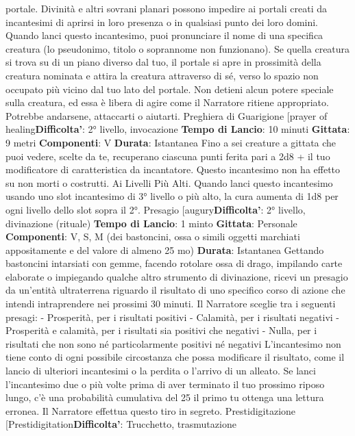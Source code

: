\begin{multicols}{2}
portale.
Divinità e altri sovrani planari possono impedire ai
portali creati da incantesimi di aprirsi in loro presenza o
in qualsiasi punto dei loro domini.
Quando lanci questo incantesimo, puoi pronunciare il
nome di una specifica creatura (lo pseudonimo, titolo o
soprannome non funzionano). Se quella creatura si
trova su di un piano diverso dal tuo, il portale si apre in
prossimità della creatura nominata e attira la creatura
attraverso di sé, verso lo spazio non occupato più vicino
dal tuo lato del portale. Non detieni alcun potere
speciale sulla creatura, ed essa è libera di agire come il
Narratore ritiene appropriato. Potrebbe andarsene, attaccarti
o aiutarti.
Preghiera di Guarigione
[prayer of healing\textbf{Difficolta'}:
2° livello, invocazione
\textbf{Tempo di Lancio}: 10 minuti
\textbf{Gittata}: 9 metri
\textbf{Componenti}: V
\textbf{Durata}: Istantanea
Fino a sei creature a gittata che puoi vedere, scelte da
te, recuperano ciascuna punti ferita pari a 2d8 + il tuo
modificatore di caratteristica da incantatore. Questo
incantesimo non ha effetto su non morti o costrutti.
Ai Livelli Più Alti. Quando lanci questo incantesimo
usando uno slot incantesimo di 3° livello o più alto, la
cura aumenta di 1d8 per ogni livello dello slot sopra il
2°.
Presagio
[augury\textbf{Difficolta'}:
2° livello, divinazione (rituale)
\textbf{Tempo di Lancio}: 1 minto
\textbf{Gittata}: Personale
\textbf{Componenti}: V, S, M (dei bastoncini, ossa o simili
oggetti marchiati appositamente e del valore di almeno
25 mo)
\textbf{Durata}: Istantanea
Gettando bastoncini intarsiati con gemme, facendo
rotolare ossa di drago, impilando carte elaborate o
impiegando qualche altro strumento di divinazione,
ricevi un presagio da un’entità ultraterrena riguardo il
risultato di uno specifico corso di azione che intendi
intraprendere nei prossimi 30 minuti. Il Narratore sceglie tra i
seguenti presagi:
- Prosperità, per i risultati positivi
- Calamità, per i risultati negativi
- Prosperità e calamità, per i risultati sia positivi che
negativi
- Nulla, per i risultati che non sono né particolarmente
positivi né negativi
L’incantesimo non tiene conto di ogni possibile
circostanza che possa modificare il risultato, come il
lancio di ulteriori incantesimi o la perdita o l’arrivo di un
alleato.
Se lanci l’incantesimo due o più volte prima di aver
terminato il tuo prossimo riposo lungo, c’è una
probabilità cumulativa del 25%
il primo tu ottenga una lettura erronea. Il Narratore effettua
questo tiro in segreto.
Prestidigitazione
[Prestidigitation\textbf{Difficolta'}:
Trucchetto, trasmutazione

\end{multicols}
